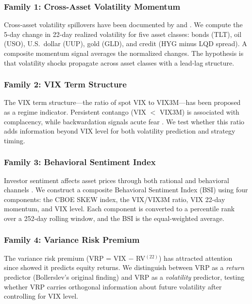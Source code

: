 \documentclass[12pt,a4paper]{article}
\begin{document}
\subsubsection{Family 1: Cross-Asset Volatility Momentum}

Cross-asset volatility spillovers have been documented by \citet{diebold2012} and \citet{barunik2016}. We compute the 5-day change in 22-day realized volatility for five asset classes: bonds (TLT), oil (USO), U.S.\ dollar (UUP), gold (GLD), and credit (HYG minus LQD spread). A composite momentum signal averages the normalized changes. The hypothesis is that volatility shocks propagate across asset classes with a lead-lag structure.

\subsubsection{Family 2: VIX Term Structure}

The VIX term structure---the ratio of spot VIX to VIX3M---has been proposed as a regime indicator. Persistent contango (VIX $<$ VIX3M) is associated with complacency, while backwardation signals acute fear \citep{luo2019}. We test whether this ratio adds information beyond VIX level for both volatility prediction and strategy timing.

\subsubsection{Family 3: Behavioral Sentiment Index}

Investor sentiment affects asset prices through both rational and behavioral channels \citep{baker2006}. We construct a composite Behavioral Sentiment Index (BSI) using four components: the CBOE SKEW index, the VIX/VIX3M ratio, VIX 22-day momentum, and VIX level. Each component is converted to a percentile rank over a 252-day rolling window, and the BSI is the equal-weighted average.

\subsubsection{Family 4: Variance Risk Premium}

The variance risk premium (VRP = VIX $-$ RV$^{(22)}$) has attracted attention since \citet{bollerslev2009} showed it predicts equity returns. We distinguish between VRP as a \emph{return} predictor (Bollerslev's original finding) and VRP as a \emph{volatility} predictor, testing whether VRP carries orthogonal information about future volatility after controlling for VIX level.
\end{document}
